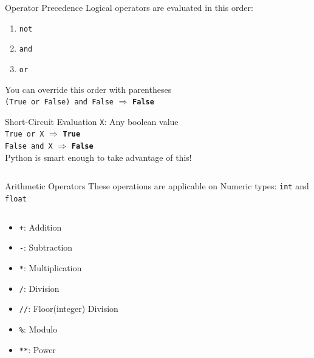         \begin{frame}{Operator Precedence}
            \LARGE
            Logical operators are evaluated in this order:
            \begin{enumerate}
                \item \texttt{not}
                \item \texttt{and}
                \item \texttt{or}
            \end{enumerate}
            You can override this order with parentheses\\
            \texttt{(True or False) and False} $\Rightarrow$ \textbf{\texttt{False}} \\
        \end{frame}

        \begin{frame}{Short-Circuit Evaluation}
            \LARGE
            \texttt{X}: Any boolean value\\
            \texttt{True or X} $\Rightarrow$ \textbf{\texttt{True}}\\
            \texttt{False and X} $\Rightarrow$ \textbf{\texttt{False}}\\
            Python is smart enough to take advantage of this!
            \inputminted[frame=single,framesep=2pt]{python3}{../Lecture2/code-examples/short_circuit.py}
        \end{frame}

        \begin{frame}{Arithmetic Operators}
            \LARGE
            These operations are applicable on Numeric types: \texttt{int} and \texttt{float}
            \begin{columns}
               \begin{column}{0.35\textwidth}
                \vspace{-5mm}
                \begin{itemize}
                    \item \texttt{+}: Addition
                    \item \texttt{-}: Subtraction
                    \item \texttt{*}: Multiplication
                    \item \texttt{/}: Division
                    \item \texttt{//}: Floor(integer) Division
                    \item \texttt{\%}: Modulo
                    \item \texttt{**}: Power 
                \end{itemize}
               \end{column}
               
               \begin{column}{0.65\textwidth}
                \inputminted[frame=single,framesep=2pt]{python3}{../Lecture2/code-examples/numeric_operators.py}
               \end{column} 
            \end{columns}
        \end{frame}

